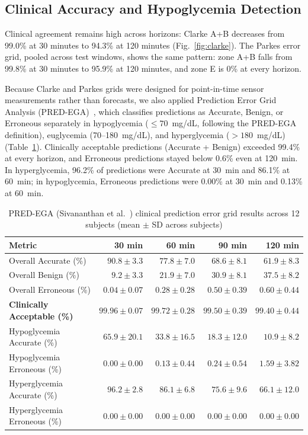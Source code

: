\documentclass[journal]{IEEEtran}
\begin{document}
\subsection{Clinical Accuracy and Hypoglycemia Detection}

Clinical agreement remains high across horizons: Clarke A+B decreases from 99.0\% at 30 minutes to 94.3\% at 120 minutes (Fig.~\ref{fig:clarke}). The Parkes error grid, pooled across test windows, shows the same pattern: zone A+B falls from 99.8\% at 30 minutes to 95.9\% at 120 minutes, and zone E is 0\% at every horizon.

Because Clarke and Parkes grids were designed for point-in-time sensor measurements rather than forecasts, we also applied Prediction Error Grid Analysis (PRED-EGA)~\cite{ref53}, which classifies predictions as Accurate, Benign, or Erroneous separately in hypoglycemia ($\le 70$~mg/dL, following the PRED-EGA definition), euglycemia (70--180~mg/dL), and hyperglycemia ($> 180$~mg/dL) (Table~\ref{tab:predega}). Clinically acceptable predictions (Accurate + Benign) exceeded 99.4\% at every horizon, and Erroneous predictions stayed below 0.6\% even at 120~min. In hyperglycemia, 96.2\% of predictions were Accurate at 30~min and 86.1\% at 60~min; in hypoglycemia, Erroneous predictions were 0.00\% at 30~min and 0.13\% at 60~min.

\begin{table}[t]
\centering
\caption{PRED-EGA (Sivananthan et al.~\cite{ref53}) clinical prediction error grid results across 12 subjects (mean $\pm$ SD across subjects)}
\label{tab:predega}
\footnotesize
\begin{tabular}{lrrrr}
\toprule
Metric & 30 min & 60 min & 90 min & 120 min \\
\midrule
Overall Accurate (\%) & $90.8 \pm 3.3$ & $77.8 \pm 7.0$ & $68.6 \pm 8.1$ & $61.9 \pm 8.3$ \\
Overall Benign (\%) & $9.2 \pm 3.3$ & $21.9 \pm 7.0$ & $30.9 \pm 8.1$ & $37.5 \pm 8.2$ \\
Overall Erroneous (\%) & $0.04 \pm 0.07$ & $0.28 \pm 0.28$ & $0.50 \pm 0.39$ & $0.60 \pm 0.44$ \\
\textbf{Clinically Acceptable (\%)} & $\mathbf{99.96 \pm 0.07}$ & $\mathbf{99.72 \pm 0.28}$ & $\mathbf{99.50 \pm 0.39}$ & $\mathbf{99.40 \pm 0.44}$ \\
\midrule
Hypoglycemia Accurate (\%) & $65.9 \pm 20.1$ & $33.8 \pm 16.5$ & $18.3 \pm 12.0$ & $10.9 \pm 8.2$ \\
Hypoglycemia Erroneous (\%) & $0.00 \pm 0.00$ & $0.13 \pm 0.44$ & $0.24 \pm 0.54$ & $1.59 \pm 3.82$ \\
Hyperglycemia Accurate (\%) & $96.2 \pm 2.8$ & $86.1 \pm 6.8$ & $75.6 \pm 9.6$ & $66.1 \pm 12.0$ \\
Hyperglycemia Erroneous (\%) & $0.00 \pm 0.00$ & $0.00 \pm 0.00$ & $0.00 \pm 0.00$ & $0.00 \pm 0.00$ \\
\bottomrule
\end{tabular}
\end{table}
\end{document}
